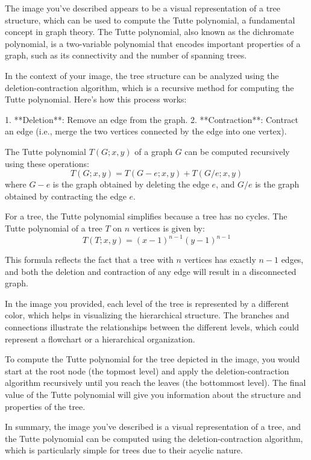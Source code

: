 The image you've described appears to be a visual representation of a tree structure, which can be used to compute the Tutte polynomial, a fundamental concept in graph theory. The Tutte polynomial, also known as the dichromate polynomial, is a two-variable polynomial that encodes important properties of a graph, such as its connectivity and the number of spanning trees.

In the context of your image, the tree structure can be analyzed using the deletion-contraction algorithm, which is a recursive method for computing the Tutte polynomial. Here's how this process works:

1. **Deletion**: Remove an edge from the graph.
2. **Contraction**: Contract an edge (i.e., merge the two vertices connected by the edge into one vertex).

The Tutte polynomial \( T(G; x, y) \) of a graph \( G \) can be computed recursively using these operations:
\[ T(G; x, y) = T(G - e; x, y) + T(G / e; x, y) \]
where \( G - e \) is the graph obtained by deleting the edge \( e \), and \( G / e \) is the graph obtained by contracting the edge \( e \).

For a tree, the Tutte polynomial simplifies because a tree has no cycles. The Tutte polynomial of a tree \( T \) on \( n \) vertices is given by:
\[ T(T; x, y) = (x - 1)^{n-1} (y - 1)^{n-1} \]

This formula reflects the fact that a tree with \( n \) vertices has exactly \( n-1 \) edges, and both the deletion and contraction of any edge will result in a disconnected graph.

In the image you provided, each level of the tree is represented by a different color, which helps in visualizing the hierarchical structure. The branches and connections illustrate the relationships between the different levels, which could represent a flowchart or a hierarchical organization.

To compute the Tutte polynomial for the tree depicted in the image, you would start at the root node (the topmost level) and apply the deletion-contraction algorithm recursively until you reach the leaves (the bottommost level). The final value of the Tutte polynomial will give you information about the structure and properties of the tree.

In summary, the image you've described is a visual representation of a tree, and the Tutte polynomial can be computed using the deletion-contraction algorithm, which is particularly simple for trees due to their acyclic nature.